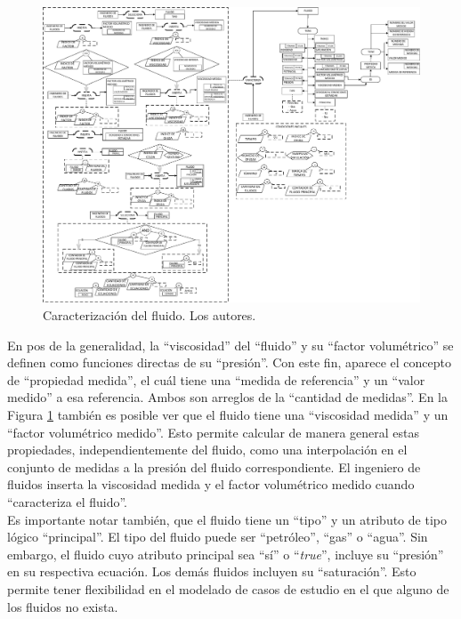 \begin{figure}[h]
	\centering%
	\includegraphics[width=0.9\linewidth]{Fig/Fluid.pdf}%
	\caption[Caracterización del fluido.]{Caracterización del fluido. Los autores.} \label{fig:Fluid}
\end{figure}

En pos de la generalidad, la ``viscosidad'' del ``fluido'' y su ``factor volumétrico'' se definen como funciones directas de su ``presión''. Con este fin, aparece el concepto de ``propiedad medida'', el cuál tiene una ``medida de referencia'' y un ``valor medido'' a esa referencia. Ambos son arreglos de la ``cantidad de medidas''. En la Figura \ref{fig:Fluid} también es posible ver que el fluido tiene una ``viscosidad medida'' y un ``factor volumétrico medido''. Esto permite calcular de manera general estas propiedades, independientemente del fluido, como una interpolación en el conjunto de medidas a la presión del fluido correspondiente. El ingeniero de fluidos inserta la viscosidad medida y el factor volumétrico medido cuando ``caracteriza el fluido''. \\

Es importante notar también, que el fluido tiene un ``tipo'' y un atributo de tipo lógico ``principal''. El tipo del fluido puede ser ``petróleo'', ``gas'' o ``agua''. Sin embargo, el fluido cuyo atributo principal sea ``sí'' o ``\textit{true}'', incluye su ``presión'' en su respectiva ecuación. Los demás fluidos incluyen su ``saturación''. Esto permite tener flexibilidad en el modelado de casos de estudio en el que alguno de los fluidos no exista.
 
